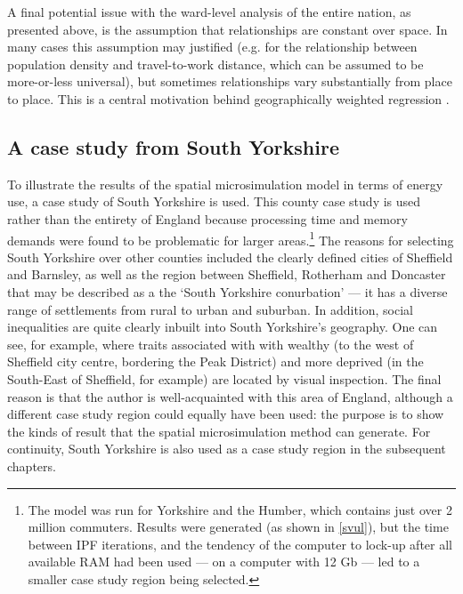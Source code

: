 A final potential issue with the ward-level analysis of the entire nation, as presented
above, is the assumption that relationships are constant over space.
In many cases this assumption may justified (e.g. for the relationship between
population density and travel-to-work distance, which can be assumed to be
more-or-less universal), but sometimes relationships vary
substantially from place to place. This is a central motivation behind
geographically weighted regression \citep{Fotheringham2002}.

\subsection{A case study from South Yorkshire} \label{soyoref}
To illustrate the results of the spatial microsimulation model
in terms of energy use, a case study of South Yorkshire is used.
This county case study is used rather than the entirety of England because
processing time and memory demands were found to be problematic for
larger areas.\footnote{The
model was run for
Yorkshire and the Humber, which contains just over 2 million commuters.
Results were generated (as shown in \cref{svul}), but the time between
IPF iterations, and the tendency of the computer to lock-up after all
available RAM had been used --- on a computer with 12 Gb ---
led to a smaller case study region being selected.
}
The reasons for selecting South Yorkshire over other counties included the
clearly defined cities of Sheffield and Barnsley, as well as the region
between Sheffield, Rotherham and Doncaster that may be described as a
the `South Yorkshire conurbation' \citep{barker1978perthes} --- it has
a diverse range of settlements from rural to urban and suburban.
In addition, social inequalities are quite clearly inbuilt into South Yorkshire's
geography. One can see, for example, where traits associated with
with wealthy (to the west of Sheffield city centre, bordering
the Peak District) and more deprived (in the South-East of Sheffield,
for example) are located by visual inspection. The final reason
is that the author is well-acquainted with this area of England,
although a different case study region could equally have been used:
the purpose is to show the kinds of result that the
spatial microsimulation method can generate.
For continuity, 
South Yorkshire is also used as a case study region in the subsequent chapters.

